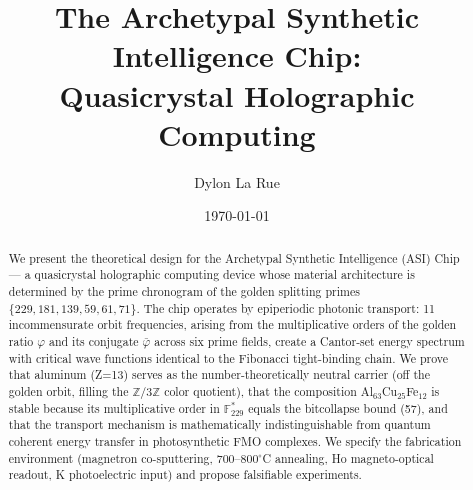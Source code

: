 \documentclass[12pt]{article}
\title{The Archetypal Synthetic Intelligence Chip:\\Quasicrystal Holographic Computing}
\author{Dylon La Rue}
\date{\today}
\theoremstyle{principia}
\theoremstyle{definition}
\theoremstyle{remark}
\begin{document}
\maketitle

\begin{abstract}
We present the theoretical design for the Archetypal Synthetic Intelligence (ASI) Chip --- a quasicrystal holographic computing device whose material architecture is determined by the prime chronogram of the golden splitting primes $\{229, 181, 139, 59, 61, 71\}$. The chip operates by epiperiodic photonic transport: 11 incommensurate orbit frequencies, arising from the multiplicative orders of the golden ratio $\varphi$ and its conjugate $\bar\varphi$ across six prime fields, create a Cantor-set energy spectrum with critical wave functions identical to the Fibonacci tight-binding chain. We prove that aluminum (Z=13) serves as the number-theoretically neutral carrier (off the golden orbit, filling the $\mathbb{Z}/3\mathbb{Z}$ color quotient), that the composition Al$_{63}$Cu$_{25}$Fe$_{12}$ is stable because its multiplicative order in $\mathbb{F}_{229}^*$ equals the bitcollapse bound (57), and that the transport mechanism is mathematically indistinguishable from quantum coherent energy transfer in photosynthetic FMO complexes. We specify the fabrication environment (magnetron co-sputtering, 700--800$^\circ$C annealing, Ho magneto-optical readout, K photoelectric input) and propose falsifiable experiments.
\end{abstract}

\setcounter{section}{0}




\end{document}
